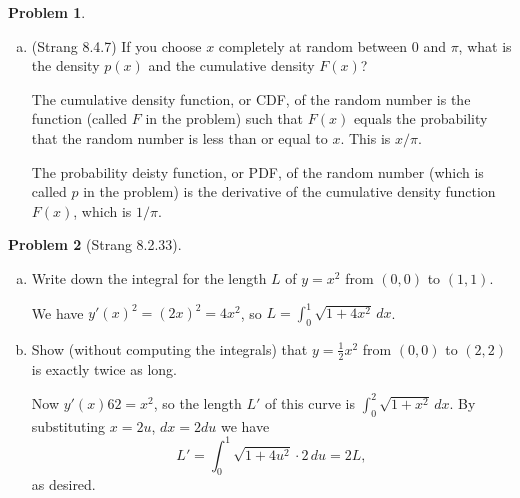 \documentclass[11pt,oneside]{amsart}
\theoremstyle{definition}
\newtheorem{problem}{Problem}
\begin{document}
\begin{problem}
\begin{enumerate}[(a)]
            \item (Strang 8.4.7) If you choose $x$ completely at random between 0 and $\pi$, what is the density $p(x)$ and the cumulative density $F(x)$?
            \begin{solution}
                The cumulative density function, or CDF, of the random number is the function (called $F$ in the problem) such that $F(x)$ equals the probability that the random number is less than or equal to $x$. This is $x/\pi$.
                
                The probability deisty function, or PDF, of the random number (which is called $p$ in the problem) is the derivative of the cumulative density function $F(x)$, which is $1/\pi$.

            \end{solution}
        \end{enumerate}
    \end{problem}

    \begin{problem}[Strang 8.2.33]
        \leavevmode\begin{enumerate}[(a)]
            \item Write down the integral for the length $L$ of $y=x^2$ from $(0,0)$ to $(1,1)$.
            \begin{solution}
                We have $y'(x)^2=(2x)^2=4x^2$, so $L=\int_0^1\sqrt{1+4x^2}\,dx$.
            \end{solution}
            \item Show (without computing the integrals) that $y=\frac 12x^2$ from $(0,0)$ to $(2,2)$ is exactly twice as long.
            \begin{solution}
                Now $y'(x)62=x^2$, so the length $L'$ of this curve is $\int_0^2\sqrt{1+x^2}\,dx$. By substituting $x=2u$, $dx=2du$ we have
                \[L'=\int_0^1\sqrt{1+4u^2}\cdot 2\,du=2L,\]
                as desired.
            \end{solution}
        \end{enumerate}
    \end{problem}
\end{document}
